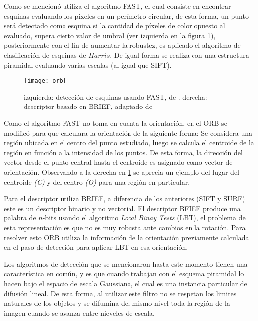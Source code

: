 Como se mencionó utiliza el algoritmo FAST, el cual consiste en encontrar esquinas evaluando los píxeles en un perímetro circular, de esta forma, un punto será detectado como esquina si la cantidad de píxeles de color opuesto al evaluado, supera cierto valor de umbral (ver izquierda en la figura \ref{imagen:orb}), posteriormente con el fin de aumentar la robustez, es aplicado el algoritmo de clasificación de esquinas de $Harris$. De igual forma se realiza con una estructura piramidal evaluando varias escalas (al igual que SIFT).

\begin{figure}[H]
	\centering
	\texttt{[image: orb]}
	\caption[Detector y descriptor ORB]{izquierda: detección de esquinas usando FAST, de \cite{fast}. derecha: descriptor basado en BRIEF, adaptado de\protect\footnotemark }
	\label{imagen:orb}
\end{figure}

Como el algoritmo FAST no toma en cuenta la orientación, en el ORB se modificó para que calculara la orientación de la siguiente forma: Se considera una región ubicada en el centro del punto estudiado, luego se calcula el centroide de la región en función a la intensidad de los puntos. De esta forma, la dirección del vector desde el punto central  hasta el centroide es asignado como vector de orientación. Observando a la derecha en \ref{imagen:orb} se aprecia un ejemplo del lugar del centroide \textit{(C)} y del centro \textit{(O)} para una región en particular.


Para el descriptor utiliza BRIEF, a diferencia de los anteriores (SIFT y SURF) este es un descriptor binario y no vectorial. El descriptor BFIEF produce una palabra de $n$-bits usando el algoritmo \textit{Local Binay Tests} (LBT), el problema de esta representación es que no es muy robusta ante cambios en la rotación. Para resolver esto ORB utiliza la información de la orientación previamente calculada en el paso de detección para aplicar LBT en esa orientación.

Los algoritmos de detección que se mencionaron hasta este momento tienen una característica en común, y es que cuando trabajan con el esquema piramidal lo hacen bajo el espacio de escala Gaussiano, el cual es una instancia particular de difusión lineal. De esta forma, al utilizar este filtro no se respetan los limites naturales de los objetos y se difumina del mismo nivel toda la región de la imagen cuando se avanza entre nieveles de escala.

